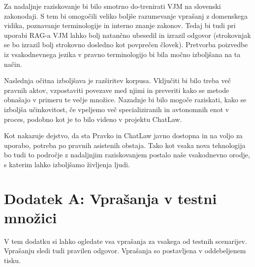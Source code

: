 \documentclass[a4paper,12pt,openright]{book}
\begin{document}
Za nadaljnje raziskovanje bi bilo smotrno do-trenirati VJM na slovenski zakonodaji. S tem bi omogočili veliko boljše razumevanje vprašanj z domenskega vidika, poznavanje terminologije in interno znanje zakonov. Tedaj bi tudi pri uporabi RAG-a VJM lahko bolj natančno ubesedil in izrazil odgovor (strokovnjak se bo izrazil bolj strokovno dosledno kot povprečen človek). Pretvorba poizvedbe iz vsakodnevnega jezika v pravno terminologijo bi bila močno izboljšana na ta način.

Naslednja očitna izboljšava je razširitev korpusa. Vključiti bi bilo treba več pravnih aktov, vzpostaviti povezave med njimi in preveriti kako se metode obnašajo v primeru te večje množice. Nazadnje bi bilo mogoče raziskati, kako se izboljša učinkovitost, če vpeljemo več specializiranih in avtonomnih enot v proces, podobno kot je to bilo videno v projektu ChatLaw.

Kot nakazuje dejstvo, da sta Pravko in ChatLaw javno dostopna in na voljo za uporabo, potreba po pravnih asistenih obstaja. Tako kot vsaka nova tehnologija bo tudi to področje z nadaljnjim raziskovanjem postalo naše vsakodnevno orodje, s katerim lahko izboljšamo življenja ljudi.

\cleardoublepage

\raggedright




\printbibliography[heading=bibintoc,title={Literatura}]

\cleardoublepage

{}
\chapter*{Dodatek A: Vprašanja v testni množici}
\label{appendix_a}

V tem dodatku si lahko ogledate vsa vprašanja za vsakega od testnih scenarijev. Vprašanju sledi tudi pravilen odgovor. Vprašanja so postavljena v oddebeljenem tisku.
\end{document}
